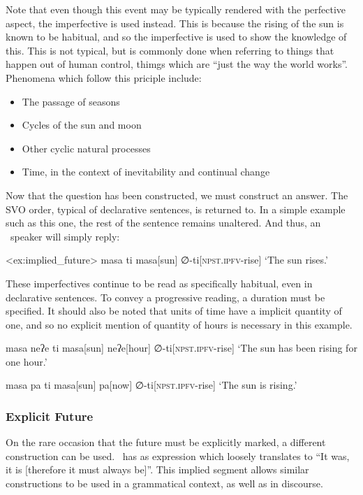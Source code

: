 Note that even though this event may be typically rendered with the perfective aspect, the imperfective is used instead.
This is because the rising of the sun is known to be habitual, and so the imperfective is used to show the knowledge of this.
This is not typical, but is commonly done when referring to things that happen out of human control, thimgs which are ``just the way the world works''.
Phenomena which follow this priciple include:

\begin{itemize}
  \item The passage of seasons
  \item Cycles of the sun and moon
  \item Other cyclic natural processes
  \item Time, in the context of inevitability and continual change
\end{itemize}

Now that the question has been constructed, we must construct an answer.
The SVO order, typical of declarative sentences, is returned to.
In a simple example such as this one, the rest of the sentence remains unaltered.
And thus, an \langname\ speaker will simply reply:

\ex<ex:implied_future>
\begingl
\glpreamble masa ti
\endpreamble
masa[sun] ∅-ti[\textsc{npst.ipfv-}rise]
\glft `The sun rises.'
\endgl
\xe

These imperfectives continue to be read as specifically habitual, even in declarative sentences.
To convey a progressive reading, a duration must be specified.
It should also be noted that units of time have a implicit quantity of one, and so no explicit mention of quantity of hours is necessary in this example.

\ex
\begingl
\glpreamble masa neʔe ti
\endpreamble
masa[sun]
neʔe[hour]
∅-ti[\textsc{npst.ipfv-}rise]
\glft `The sun has been rising for one hour.'
\endgl
\xe

\ex
\begingl
\glpreamble masa pa ti
\endpreamble
masa[sun]
pa[now]
∅-ti[\textsc{npst.ipfv-}rise]
\glft `The sun is rising.'
\endgl
\xe

\subsubsection{Explicit Future}
On the rare occasion that the future must be explicitly marked, a different construction can be used.
\langname\ has as expression which loosely translates to ``It was, it is [therefore it must always be]''.
This implied segment allows similar constructions to be used in a grammatical context, as well as in discourse.

